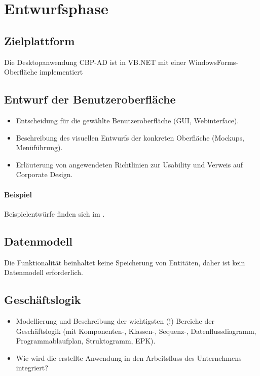 \section{Entwurfsphase} 
\label{sec:Entwurfsphase}

\subsection{Zielplattform}
\label{sec:Zielplattform}

Die Desktopanwendung \ac{CBP-AD} ist in VB.NET mit einer WindowsForms-Oberfläche implementiert



\subsection{Entwurf der Benutzeroberfläche}
\label{sec:Benutzeroberflaeche} 
\begin{itemize}
	\item Entscheidung für die gewählte Benutzeroberfläche (\zB GUI, Webinterface).
	\item Beschreibung des visuellen Entwurfs der konkreten Oberfläche (\zB Mockups, Menüführung).
	\item \Ggfs Erläuterung von angewendeten Richtlinien zur Usability und Verweis auf Corporate Design.
\end{itemize}

\paragraph{Beispiel}
Beispielentwürfe finden sich im .


\subsection{Datenmodell}
\label{sec:Datenmodell}

Die Funktionalität \gqq{\titel} beinhaltet keine Speicherung von Entitäten, daher ist kein Datenmodell erforderlich.


\subsection{Geschäftslogik}
\label{sec:Geschaeftslogik}

\begin{itemize}
	\item Modellierung und Beschreibung der wichtigsten (!) Bereiche der Geschäftslogik (\zB mit Kom\-po\-nen\-ten-, Klassen-, Sequenz-, Datenflussdiagramm, Programmablaufplan, Struktogramm, \ac{EPK}).
	\item Wie wird die erstellte Anwendung in den Arbeitsfluss des Unternehmens integriert?
\end{itemize}

